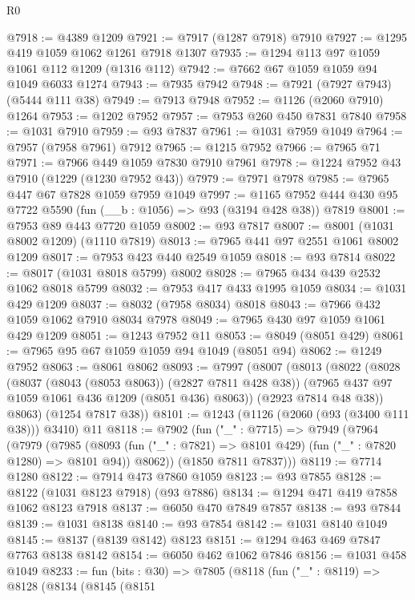 \begin{lexlean}{R0}
\begin{coremodule}
@7918 := @4389 @1209
@7921 := @7917 (@1287 @7918) @7910
@7927 := @1295 @419 @1059 @1062 @1261 @7918 @1307
@7935 := @1294 @113 @97 @1059 @1061 @112 @1209 (@1316 @112)
@7942 := @7662 @67 @1059 @1059 @94 @1049 @6033 @1274
@7943 := @7935 @7942
@7948 := @7921 (@7927 @7943) (@5444 @111 @38)
@7949 := @7913 @7948
@7952 := @1126 (@2060 @7910) @1264
@7953 := @1202 @7952
@7957 := @7953 @260 @450 @7831 @7840
@7958 := @1031 @7910
@7959 := @93 @7837
@7961 := @1031 @7959 @1049
@7964 := @7957 (@7958 @7961) @7912
@7965 := @1215 @7952
@7966 := @7965 @71
@7971 := @7966 @449 @1059 @7830 @7910 @7961
@7978 := @1224 @7952 @43 @7910 (@1229 (@1230 @7952 @43))
@7979 := @7971 @7978
@7985 := @7965 @447 @67 @7828 @1059 @7959 @1049
@7997 := @1165 @7952 @444 @430 @95 @7722 @5590 (fun (__b : @1056) => @93 (@3194 @428 @38)) @7819
@8001 := @7953 @89 @443 @7720 @1059
@8002 := @93 @7817
@8007 := @8001 (@1031 @8002 @1209) (@1110 @7819)
@8013 := @7965 @441 @97 @2551 @1061 @8002 @1209
@8017 := @7953 @423 @440 @2549 @1059
@8018 := @93 @7814
@8022 := @8017 (@1031 @8018 @5799) @8002
@8028 := @7965 @434 @439 @2532 @1062 @8018 @5799
@8032 := @7953 @417 @433 @1995 @1059
@8034 := @1031 @429 @1209
@8037 := @8032 (@7958 @8034) @8018
@8043 := @7966 @432 @1059 @1062 @7910 @8034 @7978
@8049 := @7965 @430 @97 @1059 @1061 @429 @1209
@8051 := @1243 @7952 @11
@8053 := @8049 (@8051 @429)
@8061 := @7965 @95 @67 @1059 @1059 @94 @1049 (@8051 @94)
@8062 := @1249 @7952
@8063 := @8061 @8062
@8093 := @7997
    (@8007
      (@8013
        (@8022
          (@8028
            (@8037 (@8043 (@8053 @8063)) (@2827 @7811 @428 @38))
            (@7965 @437 @97 @1059 @1061 @436 @1209 (@8051 @436) @8063))
          (@2923 @7814 @48 @38))
        @8063)
      (@1254 @7817 @38))
@8101 := @1243 (@1126 (@2060 (@93 (@3400 @111 @38))) @3410) @11
@8118 := @7902
    (fun ("_" : @7715) =>
    @7949
      (@7964
        (@7979
          (@7985
            (@8093 (fun ("_" : @7821) => @8101 @429) (fun ("_" : @7820 @1280) => @8101 @94))
            @8062))
        (@1850 @7811 @7837)))
@8119 := @7714 @1280
@8122 := @7914 @473 @7860 @1059
@8123 := @93 @7855
@8128 := @8122 (@1031 @8123 @7918) (@93 @7886)
@8134 := @1294 @471 @419 @7858 @1062 @8123 @7918
@8137 := @6050 @470 @7849 @7857
@8138 := @93 @7844
@8139 := @1031 @8138
@8140 := @93 @7854
@8142 := @1031 @8140 @1049
@8145 := @8137 (@8139 @8142) @8123
@8151 := @1294 @463 @469 @7847 @7763 @8138 @8142
@8154 := @6050 @462 @1062 @7846
@8156 := @1031 @458 @1049
@8233 := fun (bits : @30) =>
  @7805
    (@8118
      (fun ("_" : @8119) =>
      @8128
        (@8134
          (@8145
            (@8151

\end{coremodule}
\end{lexlean}
